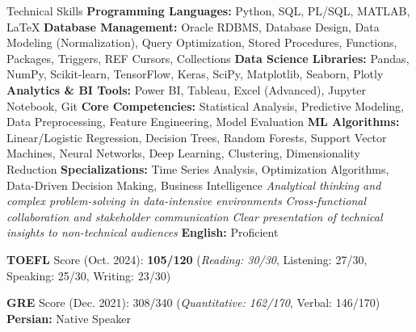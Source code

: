 \begin{rubric}{Technical Skills}
\entry*%
    \textbf{Programming Languages:} Python, SQL, PL/SQL, MATLAB, \LaTeX
\entry*%
    \textbf{Database Management:} Oracle RDBMS, Database Design, Data Modeling (Normalization), Query Optimization, Stored Procedures, Functions, Packages, Triggers, REF Cursors, Collections
\entry*%
    \textbf{Data Science Libraries:} Pandas, NumPy, Scikit-learn, TensorFlow, Keras, SciPy, Matplotlib, Seaborn, Plotly
\entry*%
    \textbf{Analytics \& BI Tools:} Power BI, Tableau, Excel (Advanced), Jupyter Notebook, Git
\entry*%
    \textbf{Core Competencies:} Statistical Analysis, Predictive Modeling, Data Preprocessing, Feature Engineering, Model Evaluation
\entry*%
    \textbf{ML Algorithms:} Linear/Logistic Regression, Decision Trees, Random Forests, Support Vector Machines, Neural Networks, Deep Learning, Clustering, Dimensionality Reduction
\entry*%
    \textbf{Specializations:} Time Series Analysis, Optimization Algorithms, Data-Driven Decision Making, Business Intelligence
\entry*%
    \textit{Analytical thinking and complex problem-solving in data-intensive environments}
\entry*%
    \textit{Cross-functional collaboration and stakeholder communication}
\entry*%
    \textit{Clear presentation of technical insights to non-technical audiences}
\entry*%
    \textbf{English:} Proficient  
    \par \textbf{TOEFL} Score (Oct. 2024): \textbf{105/120} (\textit{Reading: 30/30}, Listening: 27/30, Speaking: 25/30, Writing: 23/30)  
    \par \textbf{GRE} Score (Dec. 2021): 308/340 (\textit{Quantitative: 162/170}, Verbal: 146/170)
\entry*%
    \textbf{Persian:} Native Speaker
\end{rubric}


